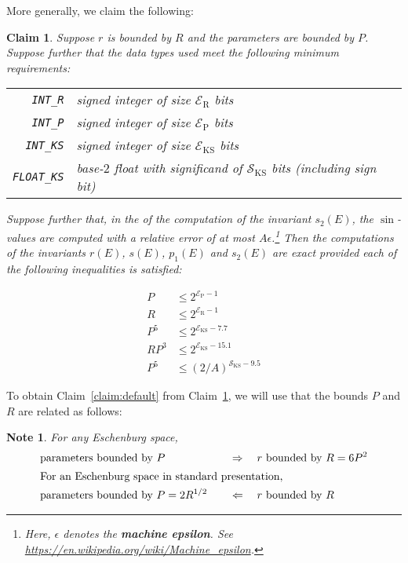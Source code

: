 \documentclass{article}
\newtheorem{note}{Note}
\newtheorem{claim}{Claim}
\newcommand{\macheps}{\epsilon} %
\newcommand{\expP}{\mathcal E_{\text{P}}}
\newcommand{\expR}{\mathcal E_{\text{R}}}
\newcommand{\expKS}{\mathcal E_{\text{KS}}}
\newcommand{\sigKS}{\mathcal S_{\text{KS}}}
\begin{document}
More generally, we claim the following:
\begin{claim}\label{claim:bits}
  Suppose \(r\) is bounded by \(R\) and the parameters are bounded by \(P\).
  Suppose further that the data types used meet the following minimum requirements:
  
  \begin{tabular}{rp{\linewidth-5em}}
    \verb+INT_R+ & signed integer of size \(\expR\) bits \\
    \verb+INT_P+ & signed integer of size \(\expP\) bits \\
    \verb+INT_KS+ & signed integer of size \(\expKS\) bits \\
    \verb+FLOAT_KS+ & base-\(2\) float with significand of \(\sigKS\) bits (including sign bit)
  \end{tabular}
  
  Suppose further that, in the of the computation of the invariant \(s_{2}(E)\), the \(\sin\)-values are computed with a relative error of at most \(A\macheps\).\footnote{
    Here, \(\macheps\) denotes the \textbf{machine epsilon}.
    See \url{https://en.wikipedia.org/wiki/Machine_epsilon}.
  }
  Then the computations of the invariants \(r(E)\), \(s(E)\), \(p_1(E)\) and \(s_2(E)\)
  are exact provided each of the following inequalities is satisfied:
  \begin{multicols}{3}
    \noindent\allowdisplaybreaks
  \begin{align*}
    P & \leq 2^{\expP-1}  \label{eq:bits:PeP}\tag{$a$}     \\
    R    & \leq 2^{\expR-1}  \label{eq:bits:ReR}\tag{$a'$}        \\
    P^5  & \leq 2^{\expKS-7.7} \label{eq:bits:PeKS} \tag{$b$}  \\
    RP^3 & \leq 2^{\expKS-15.1} \label{eq:bits:RPeKS} \tag{$b'$} \\
    P^5  & \leq (2/A)^{\sigKS-9.5}\label{eq:bits:PsKS} \tag{$c$}
  \end{align*}
  \end{multicols}
\end{claim}

To obtain Claim~\ref{claim:default} from Claim~\ref{claim:bits}, we will use that the bounds \(P\) and \(R\) are related as follows:
\begin{note}\label{lem:P-vs-R}
  For any Eschenburg space, 
  \begin{alignat*}{7}
    &\text{parameters bounded by } P &&\quad\Rightarrow\quad r \text{ bounded by } R = 6 P^2\\
    \intertext{%
    For an Eschenburg space in standard presentation,}
    &\text{parameters bounded by } P = 2R^{1/2} &&\quad\Leftarrow\quad r \text{ bounded by } R 
  \end{alignat*}
\end{note}
\end{document}
